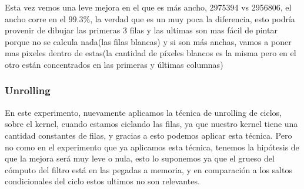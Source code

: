 Esta vez vemos una leve mejora en el que es más ancho, 2975394 vs 2956806, el ancho corre en el $99.3\%$, la verdad que es un muy poca la diferencia, esto podría provenir de dibujar las primeras 3 filas y las ultimas son mas fácil de pintar porque no se calcula nada(las filas blancas) y si son más anchas, vamos a poner mas pixeles dentro de estas(la cantidad de píxeles blancos es la misma pero en el otro están concentrados en las primeras y últimas columnas) 

\subsubsection*{Unrolling}

En este experimento, nuevamente aplicamos la técnica de unrolling de ciclos, sobre el kernel, cuando estamos ciclando las filas, ya que nuestro kernel tiene una cantidad constantes de filas, y gracias a esto podemos aplicar esta técnica. Pero no como en el experimento que ya aplicamos esta técnica, tenemos la hipótesis de que la mejora será muy leve o nula, esto lo suponemos ya que el grueso del cómputo del filtro está en las pegadas a memoria, y en comparación a los saltos condicionales del ciclo estos ultimos  no son relevantes.